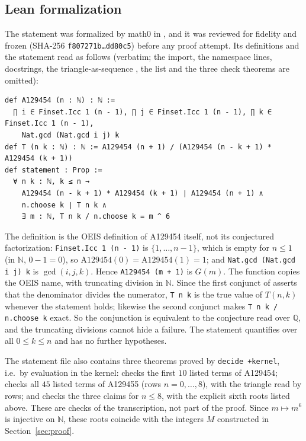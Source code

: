 \documentclass[11pt]{amsart}
\theoremstyle{plain}
\theoremstyle{definition}
\newcommand{\N}{\mathbb{N}}
\begin{document}
\subsection*{Lean formalization}
The statement was formalized by math0 in , and it was reviewed for fidelity and frozen (SHA-256 \texttt{f807271b\ldots dd80c5}) before any proof attempt. Its definitions and the statement read as follows (verbatim; the import, the namespace lines, docstrings, the triangle-as-sequence , the list  and the three check theorems are omitted):
\begin{lstlisting}
def A129454 (n : ℕ) : ℕ :=
  ∏ i ∈ Finset.Icc 1 (n - 1), ∏ j ∈ Finset.Icc 1 (n - 1), ∏ k ∈ Finset.Icc 1 (n - 1),
    Nat.gcd (Nat.gcd i j) k
def T (n k : ℕ) : ℕ := A129454 (n + 1) / (A129454 (n - k + 1) * A129454 (k + 1))
def statement : Prop :=
  ∀ n k : ℕ, k ≤ n →
    A129454 (n - k + 1) * A129454 (k + 1) ∣ A129454 (n + 1) ∧
    n.choose k ∣ T n k ∧
    ∃ m : ℕ, T n k / n.choose k = m ^ 6
\end{lstlisting}
The definition  is the OEIS definition of A129454 itself, not its conjectured factorization: \texttt{Finset.Icc 1 (n - 1)} is $\{1,\dots,n-1\}$, which is empty for $n\le1$ (in $\N$, $0-1=0$), so $\mathrm{A129454}(0)=\mathrm{A129454}(1)=1$; and \texttt{Nat.gcd (Nat.gcd i j) k} is $\gcd(i,j,k)$. Hence \texttt{A129454 (m + 1)} is $G(m)$. The function  copies the OEIS name, with truncating division in $\N$. Since the first conjunct of  asserts that the denominator divides the numerator, \texttt{T n k} is the true value of $T(n,k)$ whenever the statement holds; likewise the second conjunct makes \texttt{T n k / n.choose k} exact. So the conjunction is equivalent to the conjecture read over $\mathbb{Q}$, and the truncating divisions cannot hide a failure. The statement quantifies over all $0\le k\le n$ and has no further hypotheses.

The statement file also contains three theorems proved by \texttt{decide +kernel}, i.e.\ by evaluation in the kernel:  checks the first $10$ listed terms of A129454;  checks all $45$ listed terms of A129455 (rows $n=0,\dots,8$), with the triangle read by rows; and  checks the three claims for $n\le8$, with the explicit sixth roots listed above. These are checks of the transcription, not part of the proof. Since $m\mapsto m^6$ is injective on $\N$, these roots coincide with the integers $M$ constructed in Section~\ref{sec:proof}.
\end{document}
